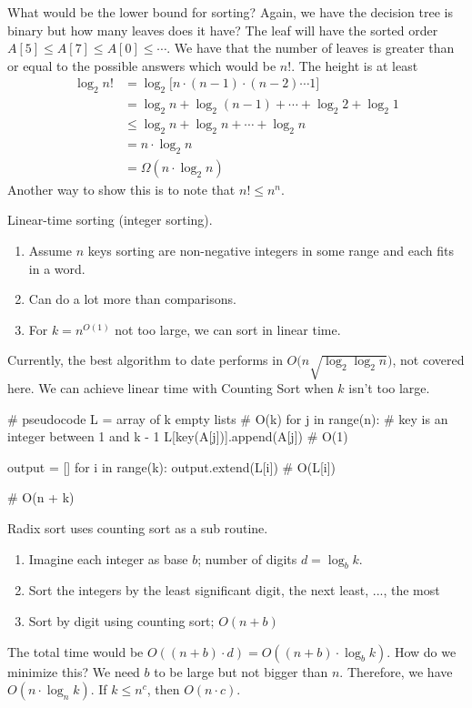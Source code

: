 What would be the lower bound for sorting? Again, we have the decision tree is binary but how many leaves
does it have? The leaf will have the sorted order \(A[5] \leq A[7] \leq A[0] \leq\cdots\). We have that the 
number of leaves is greater than or equal to the possible answers which would be \(n!\). The height is at least
\begin{align*}
	\log_2 n! & = \log_2\big[n\cdot (n - 1)\cdot (n - 2)\cdots 1\big]\\
	 & = \log_2 n + \log_2 (n - 1) + \cdots + \log_2 2 + \log_2 1\\
	 & \leq \log_2 n + \log_2 n + \cdots + \log_2 n\\
	 & = n\cdot \log_2 n\\
	 & = \Omega(n\cdot \log_2 n)
\end{align*}
Another way to show this is to note that \(n! \leq n^n\).

Linear-time sorting (integer sorting).
\begin{enumerate}[label=$\ast$]
	\item Assume \(n\) keys sorting are non-negative integers in some range and each fits in a word.
	\item Can do a lot more than comparisons.
	\item For \(k = n^{O(1)}\) not too large, we can sort in linear time.
\end{enumerate}
Currently, the best algorithm to date performs in \(O\Big(n\sqrt{\log_2\log_2 n}\Big)\), not covered here. We 
can achieve linear time with Counting Sort when \(k\) isn't too large. 
\begin{python}
# pseudocode
L = array of k empty lists  # O(k)
for j in range(n):
  # key is an integer between 1 and k - 1
  L[key(A[j])].append(A[j])  # O(1)
  
output = []
for i in range(k):
  output.extend(L[i])  # O(L[i])
  
# O(n + k)
\end{python}
Radix sort uses counting sort as a sub routine. 
\begin{enumerate}[label=$\ast$]
	\item Imagine each integer as base \(b\); number of digits \(d = \log_b k\).
	\item Sort the integers by the least significant digit, the next least, ..., the most 
	\item Sort by digit using counting sort; \(O(n + b)\)
\end{enumerate}
The total time would be \(O((n + b)\cdot d) = O((n + b)\cdot \log_b k)\). How do we minimize this? We need 
\(b\) to be large but not bigger than \(n\). Therefore, we have \(O(n\cdot\log_n k)\). If \(k\leq n^c\), then
\(O(n\cdot c)\). 


